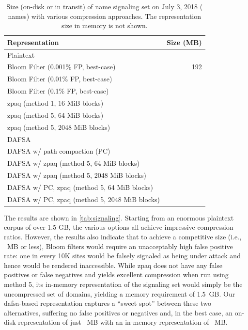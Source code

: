 \begin{table}[tbp]
  \centering
  \caption{Size (on-disk or in transit) of \ac{name} signaling set on
    July 3, 2018 (\numnames{} names) with various compression approaches. The
    representation size in memory is not shown.}
  \begin{tabular}{|lr|}
    \toprule
    \textbf{Representation} & \textbf{Size (MB)} \\
    \midrule
    Plaintext & \plaintextsize \\
    \midrule
    Bloom Filter (0.001\% FP, best-case) & 192 \\
    Bloom Filter (0.01\% FP, best-case) & \bloomlargesize \\
    Bloom Filter (0.1\% FP, best-case) & \bloommedsize \\
    \midrule
    zpaq (method 1, 16 MiB blocks) & \zpaqlargesize \\
    zpaq (method 5, 64 MiB blocks) & \zpaqmedsize \\
    zpaq (method 5, 2048 MiB blocks) & \zpaqsmallsize \\
    \midrule
    DAFSA & \fsalargesize \\
    DAFSA w/ path compaction (PC) & \fsamedsize \\
    DAFSA w/ zpaq (method 5, 64 MiB blocks) & \fsazpaqlargesize \\
    DAFSA w/ zpaq (method 5, 2048 MiB blocks) & \fsazpaqmedsize \\
    DAFSA w/ PC, zpaq (method 5, 64 MiB blocks) & \fsapczpaqlargesize \\
    DAFSA w/ PC, zpaq (method 5, 2048 MiB blocks) & \fsapczpaqmedsize \\
    \bottomrule
  \end{tabular}
  \label{tab:signaling}
\end{table}

The results are shown in \autoref{tab:signaling}.
Starting from an enormous plaintext corpus of over 1.5 GB,
the various options all achieve impressive compression ratios.
However, the results also indicate that to achieve a competitive size (i.e.,
\bloomlargesize{}~MB or less),
Bloom filters would require an unacceptably high false 
positive rate: one in every 10K sites would be falsely signaled
as being under attack and hence would be rendered inaccessible.
While zpaq does not have any false positives or false
negatives and yields excellent compression when run using method 5, 
its in-memory representation of the
signaling set would simply be the uncompressed set of domains, yielding a memory
requirement of 1.5~GB. Our \ac{dafsa}-based representation captures a ``sweet
spot'' between these two alternatives, suffering no false positives or negatives and, in the
best case, an on-disk representation of just \fsapczpaqmedsize{}~MB with an in-memory
representation of \fsamedsize{}~MB.

